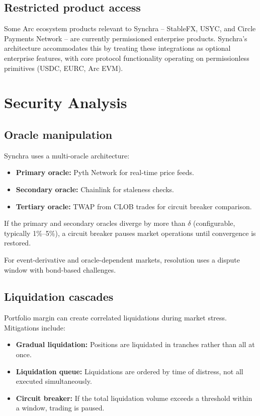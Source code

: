\documentclass[11pt,a4paper]{article}
\begin{document}
\subsection{Restricted product access}

Some Arc ecosystem products relevant to Synchra -- StableFX, USYC, and Circle Payments Network -- are currently permissioned enterprise products. Synchra's architecture accommodates this by treating these integrations as optional enterprise features, with core protocol functionality operating on permissionless primitives (USDC, EURC, Arc EVM).

\section{Security Analysis}
\label{sec:security}

\subsection{Oracle manipulation}

Synchra uses a multi-oracle architecture:
\begin{itemize}
  \item \textbf{Primary oracle:} Pyth Network for real-time price feeds.
  \item \textbf{Secondary oracle:} Chainlink for staleness checks.
  \item \textbf{Tertiary oracle:} TWAP from CLOB trades for circuit breaker comparison.
\end{itemize}

If the primary and secondary oracles diverge by more than $\delta$ (configurable, typically 1\%--5\%), a circuit breaker pauses market operations until convergence is restored.

For event-derivative and oracle-dependent markets, resolution uses a dispute window with bond-based challenges.

\subsection{Liquidation cascades}

Portfolio margin can create correlated liquidations during market stress. Mitigations include:
\begin{itemize}
  \item \textbf{Gradual liquidation:} Positions are liquidated in tranches rather than all at once.
  \item \textbf{Liquidation queue:} Liquidations are ordered by time of distress, not all executed simultaneously.
  \item \textbf{Circuit breaker:} If the total liquidation volume exceeds a threshold within a window, trading is paused.
\end{itemize}
\end{document}
